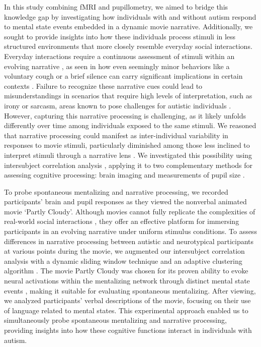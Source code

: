 In this study combining fMRI and pupillometry, we aimed to bridge this knowledge gap by investigating how individuals with and without autism respond to mental state events embedded in a dynamic movie narrative. Additionally, we sought to provide insights into how these individuals process stimuli in less structured environments that more closely resemble everyday social interactions. Everyday interactions require a continuous assessment of stimuli within an evolving narrative \citep{goffman1974,johnson2023,stolk2022}, as seen in how even seemingly minor behaviors like a voluntary cough or a brief silence can carry significant implications in certain contexts \citep{kendon1994}. Failure to recognize these narrative cues could lead to misunderstandings in scenarios that require high levels of interpretation, such as irony or sarcasm, areas known to pose challenges for autistic individuals \citep{deliens2018,zalla2014}. However, capturing this narrative processing is challenging, as it likely unfolds differently over time among individuals exposed to the same stimuli. We reasoned that narrative processing could manifest as inter-individual variability in responses to movie stimuli, particularly diminished among those less inclined to interpret stimuli through a narrative lens \citep{chang2021,finn2018,owen2023,zhang2022}. We investigated this possibility using intersubject correlation analysis \citep{hasson2004}, applying it to two complementary methods for assessing cognitive processing: brain imaging and measurements of pupil size \citep{beatty1982}. 

To probe spontaneous mentalizing and narrative processing, we recorded participants' brain and pupil responses as they viewed the nonverbal animated movie `Partly Cloudy'\citep{jacoby2016,paunov2019}. Although movies cannot fully replicate the complexities of real-world social interactions \citep{wheatley2019}, they offer an effective platform for immersing participants in an evolving narrative under uniform stimulus conditions. To assess differences in narrative processing between autistic and neurotypical participants at various points during the movie, we augmented our intersubject correlation analysis with a dynamic sliding window technique and an adaptive clustering algorithm \citep{maris2007}. The movie Partly Cloudy was chosen for its proven ability to evoke neural activations within the mentalizing network through distinct mental state events \citep{jacoby2016,richardson2018}, making it suitable for evaluating spontaneous mentalizing. After viewing, we analyzed participants' verbal descriptions of the movie, focusing on their use of language related to mental states. This experimental approach enabled us to simultaneously probe spontaneous mentalizing and narrative processing, providing insights into how these cognitive functions interact in individuals with autism.

